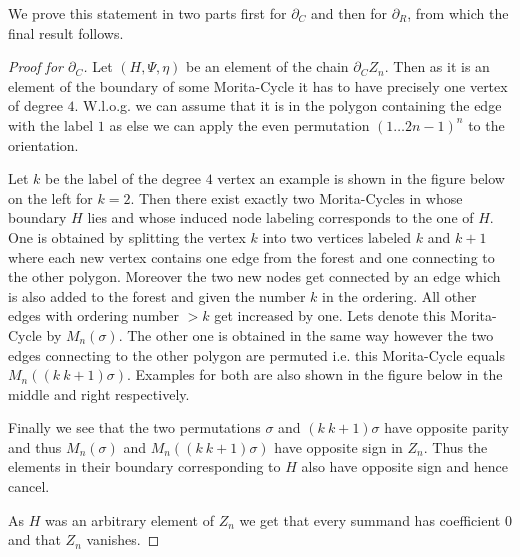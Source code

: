 We prove this statement in two parts first for $\partial_{C}$ and then for $\partial_{R}$, from which the final result follows.


\begin{proof}[Proof for $\partial_C$]
	Let $(H,\Psi,\eta)$ be an element of the chain $\partial_{C} Z_{n}$.
	Then as it is an element of the boundary of some Morita-Cycle it has to
	have precisely one vertex of degree $4$. W.l.o.g. we can assume that it is in the polygon containing the 
	edge with the label $1$ as else we can apply the even permutation $(1 \ldots 2n-1)^{n}$ to the orientation.

	Let $k$ be the label of the degree $4$ vertex an example is shown in the figure below on the left for $k = 2$. 
	Then there exist exactly two Morita-Cycles in whose boundary $H$ lies and whose induced node labeling corresponds to the one of $H$.
	One is obtained by splitting the vertex $k$ into two vertices labeled $k$ and $k+1$ where each new vertex contains one edge from the forest and one connecting to the other polygon.
	Moreover the two new nodes get connected by an edge which is also added to the forest and given the number $k$ in the ordering.
	All other edges with ordering number  $> k $ get increased by one. Lets denote this Morita-Cycle by $M_{n}(\sigma)$.
	The other one is obtained in the same way however the two edges connecting to the other polygon are permuted i.e.
	this Morita-Cycle equals $M_{n}((k\ k+1)\sigma)$.
	Examples for both are also shown in the figure below in the middle and right respectively.

	Finally we see that the two permutations $\sigma$ and $(k\ k+1) \sigma$ have opposite parity and thus $M_{n}(\sigma)$ and $M_{n}((k\ k+1) \sigma)$ have
	opposite sign in $Z_{n}$. Thus the elements in their boundary corresponding to $H$ also have opposite sign and hence cancel.

	As $H$ was an arbitrary element of $Z_{n}$ we get that every summand has coefficient $0$ and that $Z_{n}$ vanishes.
\end{proof}


